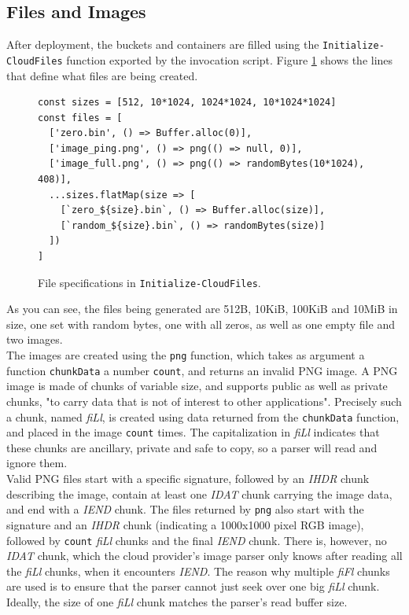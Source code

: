 \documentclass[a4paper,bibliography=totoc]{scrartcl}
\begin{document}
\subsection{Files and Images}\label{sec:files_images}
After deployment, the buckets and containers are filled using the \texttt{Initialize-CloudFiles} function exported by the invocation script.\cite{wb_invoke} Figure \ref{fig:files} shows the lines that define what files are being created.
\begin{figure}[!ht]
\begin{lstlisting}[style=ES6]
const sizes = [512, 10*1024, 1024*1024, 10*1024*1024]
const files = [
  ['zero.bin', () => Buffer.alloc(0)],
  ['image_ping.png', () => png(() => null, 0)],
  ['image_full.png', () => png(() => randomBytes(10*1024), 408)],
  ...sizes.flatMap(size => [
    [`zero_${size}.bin`, () => Buffer.alloc(size)],
    [`random_${size}.bin`, () => randomBytes(size)]
  ])
]
\end{lstlisting}
\caption{File specifications in \texttt{Initialize-CloudFiles}.\cite{wb_invoke}}
\label{fig:files}
\end{figure}%
As you can see, the files being generated are 512B, 10KiB, 100KiB and 10MiB in size, one set with random bytes, one with all zeros, as well as one empty file and two images.\\
The images are created using the \texttt{png} function, which takes as argument a function \texttt{chunkData} a number \texttt{count}, and returns an invalid PNG image. A PNG image is made of chunks of variable size, and supports public as well as private chunks, "to carry data that is not of interest to other applications".\cite{png} Precisely such a chunk, named \textit{fiLl}, is created using data returned from the \texttt{chunkData} function, and placed in the image \texttt{count} times. The capitalization in \textit{fiLl} indicates that these chunks are ancillary, private and safe to copy,\cite{png} so a parser will read and ignore them.\\
Valid PNG files start with a specific signature, followed by an \textit{IHDR} chunk describing the image, contain at least one \textit{IDAT} chunk carrying the image data, and end with a \textit{IEND} chunk.\cite{png} The files returned by \texttt{png} also start with the signature and an \textit{IHDR} chunk (indicating a 1000x1000 pixel RGB image), followed by \texttt{count} \textit{fiLl} chunks and the final \textit{IEND} chunk. There is, however, no \textit{IDAT} chunk, which the cloud provider's image parser only knows after reading all the \textit{fiLl} chunks, when it encounters \textit{IEND}. The reason why multiple \textit{fiFl} chunks are used is to ensure that the parser cannot just seek over one big \textit{fiLl} chunk. Ideally, the size of one \textit{fiLl} chunk matches the parser's read buffer size.\\
\end{document}
